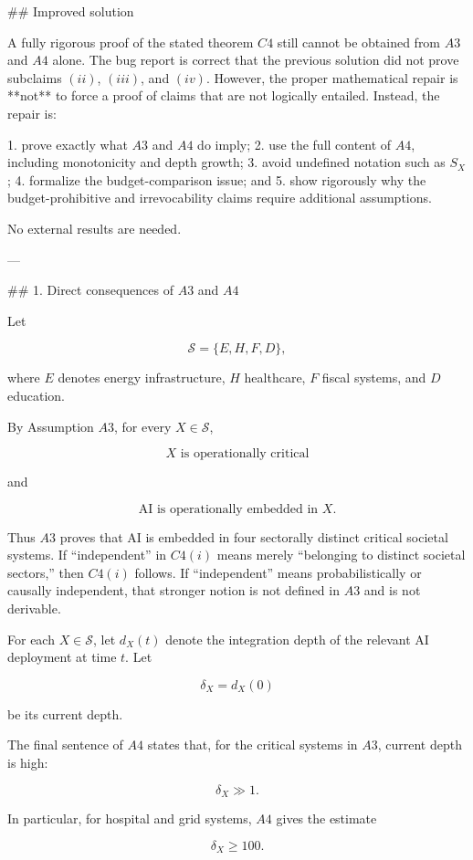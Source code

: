 ## Improved solution

A fully rigorous proof of the stated theorem \(C4\) still cannot be obtained from \(A3\) and \(A4\) alone. The bug report is correct that the previous solution did not prove subclaims \((ii)\), \((iii)\), and \((iv)\). However, the proper mathematical repair is **not** to force a proof of claims that are not logically entailed. Instead, the repair is:

1. prove exactly what \(A3\) and \(A4\) do imply;
2. use the full content of \(A4\), including monotonicity and depth growth;
3. avoid undefined notation such as \(S_X\);
4. formalize the budget-comparison issue; and
5. show rigorously why the budget-prohibitive and irrevocability claims require additional assumptions.

No external results are needed.

---

## 1. Direct consequences of \(A3\) and \(A4\)

Let

\[
\mathcal S=\{E,H,F,D\},
\]

where \(E\) denotes energy infrastructure, \(H\) healthcare, \(F\) fiscal systems, and \(D\) education.

By Assumption \(A3\), for every \(X\in\mathcal S\),

\[
X \text{ is operationally critical}
\]

and

\[
\text{AI is operationally embedded in } X.
\]

Thus \(A3\) proves that AI is embedded in four sectorally distinct critical societal systems. If “independent” in \(C4(i)\) means merely “belonging to distinct societal sectors,” then \(C4(i)\) follows. If “independent” means probabilistically or causally independent, that stronger notion is not defined in \(A3\) and is not derivable.

For each \(X\in\mathcal S\), let \(d_X(t)\) denote the integration depth of the relevant AI deployment at time \(t\). Let

\[
\delta_X=d_X(0)
\]

be its current depth.

The final sentence of \(A4\) states that, for the critical systems in \(A3\), current depth is high:

\[
\delta_X\gg 1.
\]

In particular, for hospital and grid systems, \(A4\) gives the estimate

\[
\delta_X\ge 100.
\]

